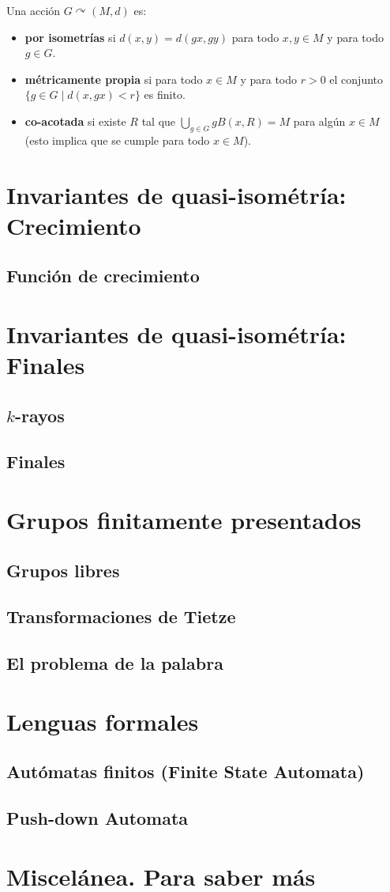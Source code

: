 \documentclass[twoside, 11pt]{article}
\begin{document}
\begin{defi}
Una acción $G\curvearrowright (M,d)$ es:
\begin{itemize}
\item \textbf{por isometrías} si $d(x,y)=d(gx,gy)$ para todo $x,y\in M$ y para todo $g\in G$. 
\item \textbf{métricamente propia} si para todo $x\in M$ y para todo $r>0$ el conjunto $\{g\in G\mid d(x,gx)<r\}$ es finito.
\item \textbf{co-acotada} si existe $R$ tal que $\bigcup_{g\in G} gB(x,R)=M$ para algún $x\in M$ (esto implica que se cumple para todo $x\in M$).
\end{itemize}
\end{defi}

\section{Invariantes de quasi-isométría: Crecimiento}
\subsection{Función de crecimiento}

\section{Invariantes de quasi-isométría: Finales}
\subsection{$k$-rayos}
\subsection{Finales}

\section{Grupos finitamente presentados}
\subsection{Grupos libres}
\subsection{Transformaciones de Tietze}
\subsection{El problema de la palabra}

\section{Lenguas formales}
\subsection{Autómatas finitos (Finite State Automata)}
\subsection{Push-down Automata}

\section{Miscelánea. Para saber más}
\end{document}
